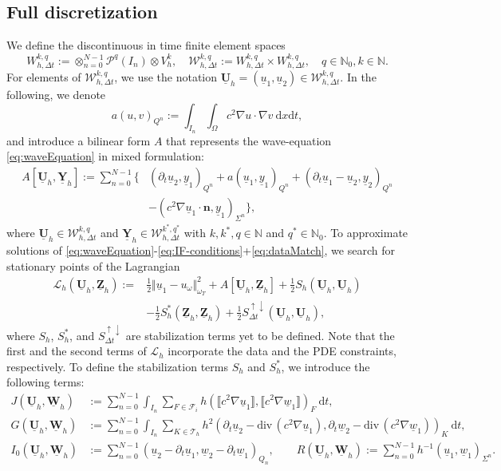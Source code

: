 \documentclass[sn-mathphys-num]{sn-jnl}
\numberwithin{equation}{section}
\newcommand{\jump}[1]{\llbracket#1\rrbracket}
\newcommand{\cL}{\mathcal{L}}
\renewcommand{\div}{\mathrm{div}\,}  %
\newcommand{\dT}{\mathrm{d}t}
\newcommand{\dX}{\mathrm{d}x}
\newcommand{\FullyDiscrSpace}[2]{ W^{ {#1},{#2}}_{h, \Delta t  } }
\newcommand{\ProdFullyDiscrSpace}[2]{ \mathcal{W}^{ {#1},{#2}}_{h, \Delta t  } }
\newcommand{\Uh}{\underline{\mathbf{U}}_h}
\newcommand{\Yh}{\underline{\mathbf{Y}}_h}
\newcommand{\Zh}{\underline{\mathbf{Z}}_h}
\newcommand{\Wh}{\underline{\mathbf{W}}_h}
\newcommand{\ul}{\underline{u}}
\newcommand{\yl}{\underline{y}}
\newcommand{\wl}{\underline{w}}
\newcommand{\Sud}{S^{\uparrow \downarrow}_{\Delta t}}
\newcommand{\dt}{\partial_t}
\begin{document}
\subsection{Full discretization}\label{sec:method}
 We define the discontinuous in time finite element spaces 
\begin{equation}
    \FullyDiscrSpace{k}{q} := \otimes_{n = 0}^{N-1} \mathcal{P}^q(I_n) \otimes V_h^k, \quad \ProdFullyDiscrSpace{k}{q} :=  \FullyDiscrSpace{k}{q} \times \FullyDiscrSpace{k}{q}, \quad q \in \mathbb{N}_0, k \in \mathbb{N}. 
\end{equation}
For elements of $\ProdFullyDiscrSpace{k}{q}$, we use the notation $\Uh = (\ul_1,\ul_2) \in \ProdFullyDiscrSpace{k}{q}$. In the following, we denote
\begin{equation*}
    a(u,v)_{Q^n} := \int_{I_n} \int_{\Omega} c^2 \nabla u \cdot \nabla v \ \dX \dT,
\end{equation*}
and introduce a bilinear form $A$ that represents the wave-equation \eqref{eq:waveEquation} in mixed formulation:  
\begin{equation}
    \begin{aligned}
        A[\Uh,\Yh] := \sum_{n = 0}^{N -1} \Big\{ &(\dt \ul_2, \yl_1)_{Q^n} + a(\ul_1,\yl_1)_{Q^n} + (\dt \ul_1 - \ul_2,\yl_2)_{Q^n} \\
        &- (c^2 \nabla \ul_1 \cdot \mathbf{n}, \yl_1)_{\Sigma^n} \Big\},
    \end{aligned}
\end{equation} 
where $\Uh \in \ProdFullyDiscrSpace{k}{q}$ and $\Yh \in \ProdFullyDiscrSpace{k^\ast}{q^\ast}$ with $k, k^\ast, q \in \mathbb{N}$ and $q^\ast \in \mathbb{N}_0$. 
To approximate solutions of \eqref{eq:waveEquation}-\eqref{eq:IF-conditions}+\eqref{eq:dataMatch}, we search for stationary points of the Lagrangian 
\begin{align*}
    \cL_h (\Uh, \Zh) := &\frac{1}{2} \Vert \ul_1 - u_{\omega} \Vert^2_{\omega_T} + A[\Uh,\Zh] + \frac{1}{2}  S_h(\Uh,\Uh) \\
    &- \frac{1}{2}  S_h^\ast(\Zh,\Zh) + \frac{1}{2} \Sud(\Uh,\Uh),
\end{align*}
where $S_h$, $S_h^\ast$, and $\Sud$ are stabilization terms yet to be defined. Note that the first and the second terms of $\cL_h$ incorporate the data and the PDE constraints, respectively. To define the stabilization terms $S_h$ and $S_h^\ast$, we introduce the following terms: 
\begin{align*}
    J(\Uh,\Wh) &:= \sum_{n = 0}^{N -1} \int_{I_n} \sum_{F \in \mathcal{F}_i} h (\jump{c^2 \nabla \ul_1}, \jump{c^2 \nabla \wl_1})_F \ \dT, \\
    G(\Uh,\Wh) &:= \sum_{n = 0}^{N -1} \int_{I_n} \sum_{K \in \mathcal{T}_h} h^2 (\dt \ul_2 - \div (c^2 \nabla \ul_1),\dt \wl_2 -\div( c^2 \nabla \wl_1))_K \ \dT, \\
    I_0(\Uh,\Wh) &:= \sum_{n = 0}^{N -1} (\ul_2 - \dt \ul_1, \wl_2-\dt \wl_1)_{Q_n}, \qquad 
    R(\Uh,\Wh) := \sum_{n = 0}^{N -1} h^{-1} (\ul_1,\wl_1)_{\Sigma^n}. 
\end{align*}
\end{document}
